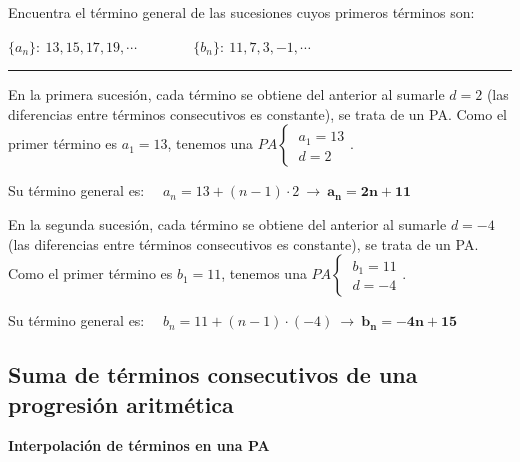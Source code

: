 \begin{miejercicio}

Encuentra el término general de las sucesiones cuyos primeros términos son:

$\{a_n\}:\ 13,15,17,19,\cdots \qquad  \qquad \{b_n\}:\ 11,7,3,-1,\cdots$

\rule{250pt}{0.1pt}
\vspace{2mm}
	
En la primera sucesión, cada término se obtiene del anterior al sumarle $d=2$ (las diferencias entre términos consecutivos es constante), se trata de un PA. Como el primer término es $a_1=13$, tenemos una $PA\begin{cases} \ a_1=13 \\ \ d=2 \end{cases}$.

\vspace{2mm} Su término general es:
$\quad a_n=13+(n-1)\cdot 2 \ \to \ \boldsymbol{a_n=2n+11}$

\vspace{4mm}

En la segunda sucesión, cada término se obtiene del anterior al sumarle $d=-4$ (las diferencias entre términos consecutivos es constante), se trata de un PA. Como el primer término es $b_1=11$, tenemos una $PA\begin{cases} \ b_1=11 \\ \ d=-4 \end{cases}$.

\vspace{2mm} Su término general es:
$\quad b_n=11+(n-1)\cdot (-4) \ \to \ \boldsymbol{b_n=-4n+15}$


\end{miejercicio}


\vspace{10mm}
\subsection{Suma de términos consecutivos de una progresión aritmética}
\vspace{0.5cm}

\begin{large}\textbf{Interpolación de términos en una PA}\end{large}

